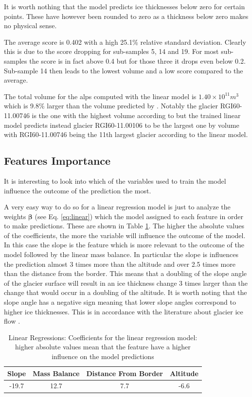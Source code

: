 It is worth nothing that the model predicts ice thicknesses below zero for certain points. These have however been rounded to zero as a thickness below zero makes no physical sense.

The average score is 0.402 with a high 25.1\% relative standard deviation. Clearly this is due to the score dropping for sub-samples 5, 14 and 19. For most sub-samples the score is in fact above 0.4 but for those three it drops even below 0.2. Sub-sample 14 then leads to the lowest volume and a low score compared to the average.

The total volume for the alps computed with the linear model is $1.40 \times 10^{11}m^3$ which is 9.8\% larger than the volume predicted by \citet{Farinotti2019}. Notably the glacier RGI60-11.00746 is the one with the highest volume according to \citet{Farinotti2019} but  the trained linear model predicts instead glacier RGI60-11.00106 to be the largest one by volume with RGI60-11.00746 being the 11th largest glacier according to the linear model.

\subsection{Features Importance}  

It is interesting to look into which of the variables used to train the model influence the outcome of the prediction the most.

A very easy way to do so for a linear regression model is just to analyze the weights $\bm{\beta}$ (see Eq. \ref{eq:linear}) which the model assigned to each feature in order to make predictions. These are shown in Table \ref{tb:lr-coef}.
The higher the absolute values of the coefficients, the more the variable will influence the outcome of the model. In this case the slope is the feature which is more relevant to the outcome of the model followed by the linear mass balance. In particular the slope is influences the prediction almost 3 times more than the altitude and over 2.5 times more than the distance from the border. This means that a doubling of the slope angle of the glacier surface will result in an ice thickness change 3 times larger than the change that would occur in a doubling of the altitude. It is worth noting that the slope angle has a negative sign meaning that lower slope angles correspond to higher ice thicknesses. This is in accordance with the literature about glacier ice flow \cite[P. 286]{cuffey2010physics}.

\begin{table}
	\centering
	\caption{Linear Regressions: Coefficients for the linear regression model: higher absolute values mean that the feature have a higher influence on the model predictions}
	\begin{tabular}{|c|c|c|c|}
		\hline 
		Slope&Mass Balance&Distance From Border&Altitude \\
		\hline
		-19.7&12.7&7.7&-6.6 \\
		\hline
	\end{tabular}
	\label{tb:lr-coef}
\end{table}

